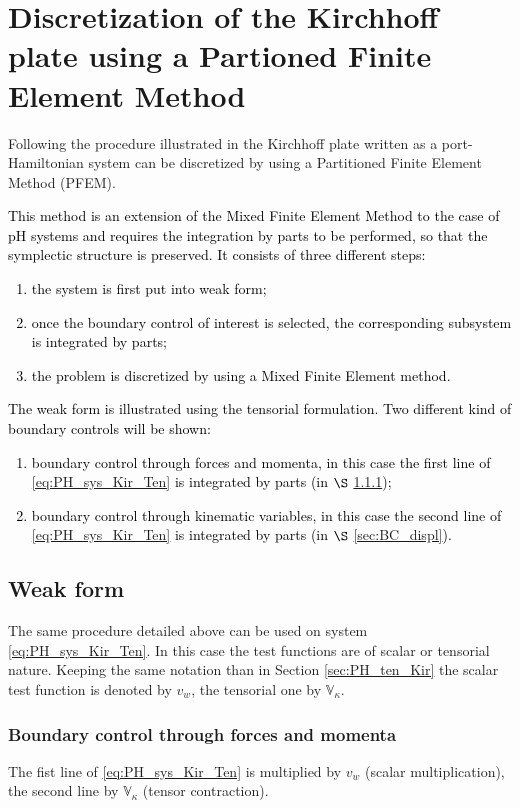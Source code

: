\documentclass[11pt]{article}
\newcommand{\revOne}[1]{\textcolor{black}{#1}}
\begin{document}
	\section{Discretization of the Kirchhoff plate using a Partioned Finite Element Method} 
	Following the procedure illustrated in \cite{CardosoRibeiro2018} the Kirchhoff plate written as a port-Hamiltonian system can be discretized by using a Partitioned Finite Element Method (PFEM). \revOne{This method is an extension of the Mixed Finite Element Method to the case of pH systems and requires the integration by parts to be performed, so that the symplectic structure is preserved. It consists of three different steps:
		\begin{enumerate}
			\item the system is first put into weak form;
			\item once the boundary control of interest is selected, the corresponding subsystem is integrated by parts;
			\item the problem is discretized by using a Mixed Finite Element method.  
		\end{enumerate}
		The weak form is illustrated using the tensorial formulation. Two different kind of boundary controls will be shown:
		\begin{enumerate}
			\item boundary control through forces and momenta, in this case the first line of \eqref{eq:PH_sys_Kir_Ten} is integrated by parts (in $\S$ \ref{sec:BC_forces});
			\item boundary control through kinematic variables, in this case the second line of \eqref{eq:PH_sys_Kir_Ten} is integrated by parts (in $\S$ \ref{sec:BC_displ}).
		\end{enumerate}
	}
	
	\subsection{Weak form}
	The same procedure detailed above can be used on system \eqref{eq:PH_sys_Kir_Ten}. In this case the test functions are of scalar or tensorial nature. Keeping the same notation than in Section \ref{sec:PH_ten_Kir} the scalar test function is denoted by $v_w$, the tensorial one by $\mathbb{V}_{\kappa}$. \\
	
	\subsubsection{Boundary control through forces and momenta}
	\label{sec:BC_forces}
	The fist line of \eqref{eq:PH_sys_Kir_Ten} is multiplied  by $v_w$ (scalar multiplication), the second line by $\mathbb{V}_{\kappa}$ (tensor contraction).
	
\end{document}
